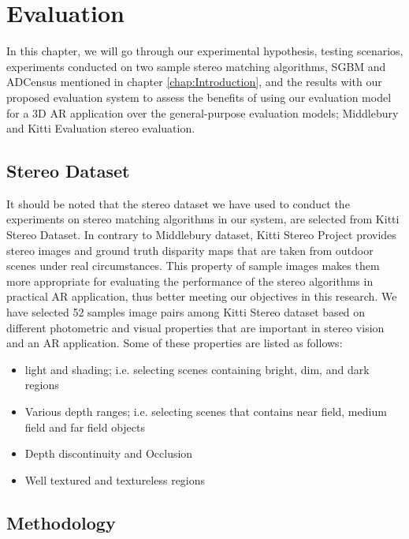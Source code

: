 \chapter{Evaluation}
\label{chap:Evaluation}
\renewcommand{\arraystretch}{0.5}

In this chapter, we will go through our experimental hypothesis, testing scenarios, experiments conducted on two sample 
stereo matching algorithms, SGBM and ADCensus mentioned in chapter \ref{chap:Introduction}, and the results with our
proposed evaluation system to assess the benefits of using our evaluation model for a 3D AR application over the general-purpose evaluation models; 
Middlebury and Kitti Evaluation stereo evaluation.

\section{Stereo Dataset}
It should be noted that the stereo dataset we have used to conduct the experiments on stereo matching algorithms in our system,
are selected from Kitti Stereo Dataset.
In contrary to Middlebury dataset, Kitti Stereo Project provides stereo images and ground truth disparity maps
that are taken from outdoor scenes under real circumstances. This property of sample images makes them more appropriate 
for evaluating the performance of the stereo algorithms in practical AR application, thus better meeting our objectives in this research.
We have selected 52 samples image pairs among Kitti Stereo dataset based on different photometric and visual properties that are important
in stereo vision and an AR application. Some 
of these properties are listed as follows:
\begin{itemize}
\item light and shading; i.e. selecting scenes containing bright, dim, and dark regions
\item Various depth ranges; i.e. selecting scenes that contains near field, medium field and far field objects  
\item Depth discontinuity and Occlusion
\item Well textured and textureless regions
\end{itemize}


\section{Methodology}

